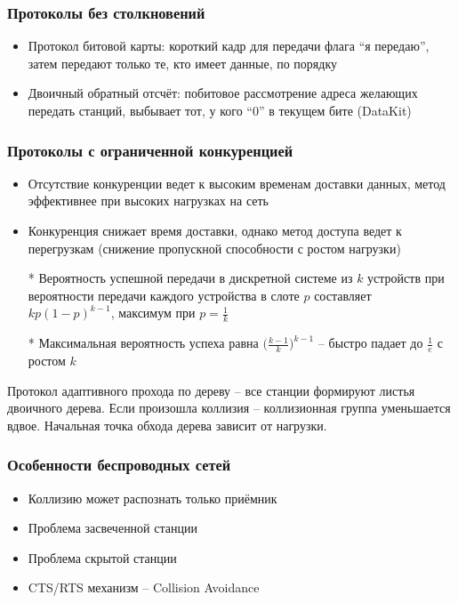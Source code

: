 \documentclass[utf8]{beamer}
\begin{document}
\begin{frame}
\frametitle{Протоколы без столкновений}
\begin{itemize}
\item Протокол битовой карты: короткий кадр для передачи флага ``я передаю'', затем передают только те, кто имеет данные, по порядку
\item Двоичный обратный отсчёт: побитовое рассмотрение адреса желающих передать станций, выбывает тот, у кого ``0'' в текущем бите (DataKit)
\end{itemize}

\end{frame}
\begin{frame}
\frametitle{Протоколы с ограниченной конкуренцией}
\begin{itemize}
\item Отсутствие конкуренции ведет к высоким временам доставки данных, метод эффективнее при высоких нагрузках на сеть
\item Конкуренция снижает время доставки, однако метод доступа ведет к перегрузкам (снижение пропускной способности с ростом нагрузки)
\end{itemize}
\begin{itemize}
\item[*] Вероятность успешной передачи в дискретной системе из $k$ устройств при вероятности передачи каждого устройства в слоте $p$ составляет $kp(1-p)^{k-1}$, максимум при $p=\frac{1}{k}$
\item[*] Максимальная вероятность успеха равна $\Big(\frac{k-1}{k}\Big)^{k-1}$ -- быстро падает до $\frac{1}{e}$ с ростом $k$
\end{itemize}
Протокол адаптивного прохода по дереву -- все станции формируют листья двоичного дерева. Если произошла коллизия -- коллизионная группа уменьшается вдвое.
Начальная точка обхода дерева зависит от нагрузки.
\end{frame}
\begin{frame}
\frametitle{Особенности беспроводных сетей}
\begin{itemize}
\item Коллизию может распознать только приёмник
\item Проблема засвеченной станции
\item Проблема скрытой станции
\item CTS/RTS механизм -- Collision Avoidance
\end{itemize}
\end{frame}
\end{document}
